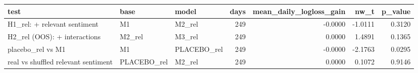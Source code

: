 \begin{tabular}{lllrrrr}
\toprule
test & base & model & days & mean\_daily\_logloss\_gain & nw\_t & p\_value \\
\midrule
H1\_rel: + relevant sentiment & M1 & M2\_rel & 249 & -0.0000 & -1.0111 & 0.3120 \\
H2\_rel (OOS): + interactions & M2\_rel & M3\_rel & 249 & 0.0000 & 1.4891 & 0.1365 \\
placebo\_rel vs M1 & M1 & PLACEBO\_rel & 249 & -0.0000 & -2.1763 & 0.0295 \\
real vs shuffled relevant sentiment & PLACEBO\_rel & M2\_rel & 249 & 0.0000 & 0.1072 & 0.9146 \\
\bottomrule
\end{tabular}
